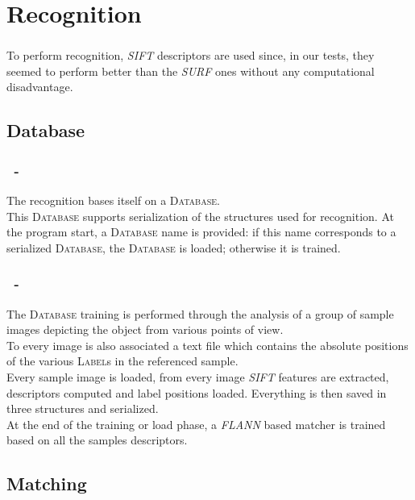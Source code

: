 \documentclass{beamer}
\begin{document}
	\section{Recognition}

	\begin{frame}
		\frametitle{\insertsection}
		To perform recognition, \emph{SIFT} descriptors are used since, in our tests,
		they seemed to perform better than the \emph{SURF} ones without any computational
		disadvantage.\\
	\end{frame}

	\subsection{Database}
	
	\begin{frame}
		\frametitle{\insertsection\ - \insertsubsection}
		The recognition bases itself on a \textsc{Database}.\\
		This \textsc{Database} supports serialization of the structures used for
		recognition. At the program start, a \textsc{Database} name is provided:
		if this name corresponds to a serialized \textsc{Database}, the
		\textsc{Database} is loaded; otherwise it is trained.\\
	\end{frame}

	\begin{frame}
		\frametitle{\insertsection\ - \insertsubsection}
		The \textsc{Database} training is performed through the analysis of a group
		of sample images depicting the object from various points of view.\\
		To every image is also associated a text file which contains the absolute
		positions of the various \textsc{Label}s in the referenced sample.\\
		Every sample image is loaded, from every image \emph{SIFT} features are
		extracted, descriptors computed and label positions loaded. Everything
		is then saved in three structures and serialized.\\
		At the end of the training or load phase, a \emph{FLANN} based matcher is
		trained based on all the samples descriptors.\\
	\end{frame}

	\subsection{Matching}
\end{document}
